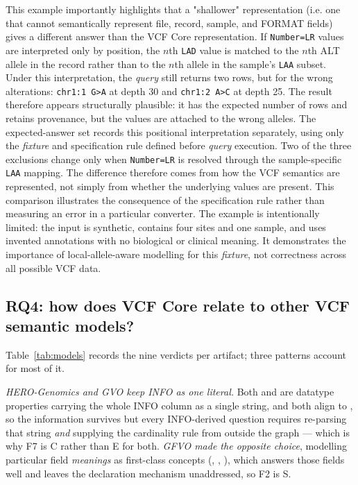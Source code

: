 This example importantly highlights that a "shallower" representation (i.e. one that cannot semantically represent file, record, sample, and FORMAT fields) gives a different answer than the VCF Core representation.
If \texttt{Number=LR} values are interpreted only by position, the $n$th \texttt{LAD} value is matched to the $n$th ALT allele in the record rather than to the $n$th allele in the sample's \texttt{LAA} subset. 
Under this interpretation, the \emph{query} still returns two rows, but for the wrong alterations: \texttt{chr1:1~G>A} at depth 30 and \texttt{chr1:2~A>C} at depth 25.
The result therefore appears structurally plausible: it has the expected number of rows and retains provenance, but the values are attached to the wrong alleles. 
The expected-answer set records this positional interpretation separately, using only the \emph{fixture} and specification rule defined before \emph{query} execution. 
Two of the three exclusions change only when \texttt{Number=LR} is resolved through the sample-specific \texttt{LAA} mapping. 
The difference therefore comes from how the VCF semantics are represented, not simply from whether the underlying values are present.
This comparison illustrates the consequence of the specification rule rather than measuring an error in a particular converter. 
The example is intentionally limited: the input is synthetic, contains four sites and one sample, and uses invented annotations with no biological or clinical meaning. 
It demonstrates the importance of local-allele-aware modelling for this \emph{fixture}, not correctness across all possible VCF data.


\subsection{RQ4: how does VCF Core relate to other VCF semantic models?}
\label{sec:models}

Table~\ref{tab:models} records the nine verdicts per artifact; three patterns account for most of it.

\emph{HERO-Genomics and GVO keep INFO as one literal.}
Both  and  are datatype properties carrying the whole INFO column as a single string, and both align to , so the information survives but every INFO-derived question requires re-parsing that string \emph{and} supplying the cardinality rule from outside the graph --- which is why F7 is C rather than E for both.
\emph{GFVO made the opposite choice}, modelling particular field \emph{meanings} as first-class concepts (, , ), which answers those fields well and leaves the declaration mechanism unaddressed, so F2 is S.

